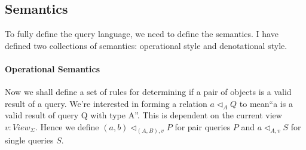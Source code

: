 \documentclass[12pt,a4paper,twoside,openright]{report}
\newcommand{\opRule}[3]{#1 \triangleleft_{#2, v} #3}
\begin{document}
\subsection{Semantics}
    To fully define the query language, we need to define the semantics. I have defined two collections of semantics: operational style and denotational style.
\paragraph{Operational Semantics}   

Now we shall define a set of rules for determining if a pair of objects is a valid result of a query. We're interested in forming a relation $a \triangleleft_A Q$ to mean``a is a valid result of query Q with type A''. This is dependent on the current view $v: View_{\Sigma}$. Hence we define $\opRule{(a, b)}{(A, B)}{P}$ for pair queries $P$ and $\opRule{a}{A}{S}$ for single queries $S$.
\end{document}
